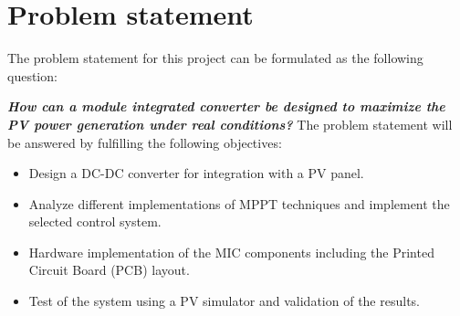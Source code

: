 \section{Problem statement}

The problem statement for this project can be formulated as the following question: 
\newline

\textbf{\textit{\large{How can a module integrated converter be designed to maximize the PV power generation under real conditions?}}}
\newline
\newline
The problem statement will be answered by fulfilling the following objectives: 

\begin{itemize}
	\item Design a DC-DC converter for integration with a PV panel.
	\item Analyze different implementations of MPPT techniques and implement the selected control system. 
	\item Hardware implementation of the MIC components including the Printed Circuit Board (PCB) layout.
	\item Test of the system using a PV simulator and validation of the results. 
\end{itemize}

